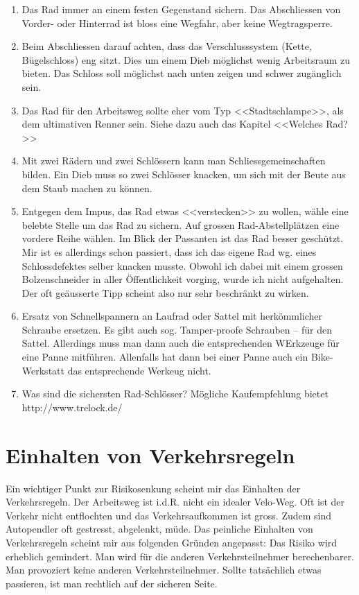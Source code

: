 \begin{enumerate}
  \item Das Rad immer an einem festen Gegenstand sichern. Das Abschliessen von Vorder- oder Hinterrad ist bloss eine 
    Wegfahr, aber keine Wegtragsperre.

  \item Beim Abschliessen darauf achten, dass das Verschlusssystem (Kette, Bügelschloss) eng sitzt.
    Dies um einem Dieb möglichst wenig Arbeitsraum zu bieten. Das Schloss soll möglichst nach unten zeigen und
    schwer zugänglich sein.

  \item Das Rad für den Arbeitsweg sollte eher vom Typ <<Stadtschlampe>>, als dem ultimativen Renner sein.
    Siehe dazu auch das Kapitel <<Welches Rad?>>

  \item Mit zwei Rädern und zwei Schlössern kann man Schliessgemeinschaften bilden.
    Ein Dieb muss so zwei Schlösser knacken, um sich mit der Beute aus dem Staub machen zu können.

  \item Entgegen dem Impus, das Rad etwas <<verstecken>> zu wollen, wähle eine belebte Stelle um das Rad zu sichern.
    Auf grossen Rad-Abstellplätzen eine vordere Reihe wählen.
    Im Blick der Passanten ist das Rad besser geschützt.
    Mir ist es allerdings schon passiert, dass ich das eigene Rad wg. eines Schlossdefektes selber knacken musste.
    Obwohl ich dabei mit einem grossen Bolzenschneider in aller Öffentlichkeit vorging, wurde ich nicht aufgehalten.
    Der oft geäusserte Tipp scheint also nur sehr beschränkt zu wirken.

  \item Ersatz von Schnellspannern an Laufrad oder Sattel mit herkömmlicher Schraube ersetzen.
    Es gibt auch sog. Tamper-proofe Schrauben -- für den Sattel. Allerdings muss man dann auch die entsprechenden WErkzeuge
    für eine Panne mitführen. Allenfalls hat dann bei einer Panne auch ein Bike-Werkstatt das entsprechende Werkeug nicht.

  \item Was sind die sichersten Rad-Schlösser? Mögliche Kaufempfehlung bietet http://www.trelock.de/

\end{enumerate}

\section{Einhalten von Verkehrsregeln}
Ein wichtiger Punkt zur Risikosenkung scheint mir das Einhalten der Verkehrsregeln. Der Arbeitsweg ist i.d.R. nicht ein idealer Velo-Weg. Oft ist der Verkehr nicht entflochten und das Verkehrsaufkommen ist gross. Zudem sind Autopendler oft gestresst, abgelenkt, müde.  Das peinliche Einhalten von Verkehrsregeln scheint mir aus folgenden Gründen angepasst:
Das Risiko wird erheblich gemindert. Man wird für die anderen Verkehrsteilnehmer berechenbarer.
Man provoziert keine anderen Verkehrsteilnehmer.
Sollte tatsächlich etwas passieren, ist man rechtlich auf der sicheren Seite.
\cite{Flieshardt2015}

